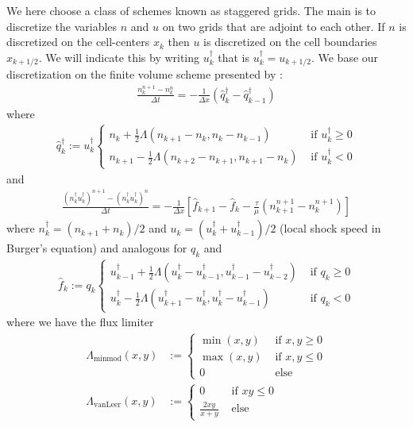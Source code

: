 We here choose a class of schemes known as staggered grids. The main is to discretize
the variables $n$ and $u$ on two grids that are adjoint to each other.
If $n$ is discretized on the cell-centers $x_k$ then $u$ is discretized on the cell
boundaries $x_{k+1/2}$. We will indicate this by writing $u^\dagger_k$ that is $u^\dagger_k = u_{k+1/2}$.
We base our discretization on the finite volume scheme presented by
\cite{Gunawan2015,Herbin2013}:
\begin{align}
    \frac{n_k^{n+1} - n_k^n}{\Delta t} = - \frac{1}{\Delta x}(\hat q^\dagger_k  - \hat q^\dagger_{k-1})
\end{align}
where
\begin{align}
    \hat q^\dagger_k := u^\dagger_k \begin{cases}
        n_k     + \frac{1}{2}\Lambda( n_{k+1}-n_k    , n_k - n_{k-1})&\text{ if } u^\dagger_k \geq 0 \\
        n_{k+1} - \frac{1}{2}\Lambda( n_{k+2}-n_{k+1}, n_{k+1} - n_k)&\text{ if } u^\dagger_k < 0
    \end{cases}
\end{align}
and
\begin{align}
    \frac{(n_k^\dagger u_k^\dagger)^{n+1}-(n_k^\dagger u_k^\dagger)^{n}}{\Delta
    t} = - \frac{1}{\Delta x} \left[ \hat f_{k+1} - \hat f_k -
    \frac{\tau}{\mu} \left(n_{k+1}^{n+1} - n_k^{n+1}\right)  \right]
\end{align}
where $n^\dagger_k = \left(n_{k+1}+n_k\right)/2$ and $u_k =
\left(u^\dagger_k + u^\dagger_{k-1}\right)/2$ (local shock speed in Burger's equation)
and analogous for $q_k$ and
\begin{align}
    \hat f_k := q_k \begin{cases}
        u^\dagger_{k-1} + \frac{1}{2}\Lambda( u^\dagger_{k}-u^\dagger_{k-1}, u^\dagger_{k-1} - u^\dagger_{k-2})&\text{ if } q_k \geq 0 \\
        u^\dagger_k     - \frac{1}{2}\Lambda( u^\dagger_{k+1}-u^\dagger_k    , u^\dagger_k - u^\dagger_{k-1})&\text{ if } q_k < 0
    \end{cases}
\end{align}
where we have the flux limiter
\begin{align}
\Lambda_{\text{minmod}}(x,y) &:=
    \begin{cases}
        \min(x,y) & \text{ if } x,y \geq 0 \\
        \max(x,y) & \text{ if } x,y \leq 0 \\
        0         & \text{ else }
    \end{cases}
    \\
\Lambda_{\text{vanLeer}}(x,y) &:=
    \begin{cases}
        0               & \text{ if } xy \leq 0 \\
        \frac{2xy}{x+y} & \text{ else }
    \end{cases}
\end{align}

